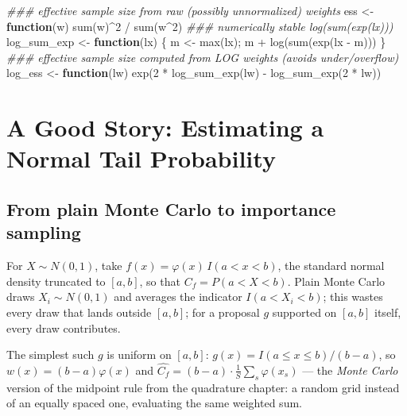 \documentclass[
  letterpaper,
  DIV=11,
  numbers=noendperiod]{scrreprt}
\newenvironment{Shaded}{\begin{snugshade}}{\end{snugshade}}
\newcommand{\ControlFlowTok}[1]{\textcolor[rgb]{0.00,0.23,0.31}{\textbf{#1}}}
\newcommand{\DecValTok}[1]{\textcolor[rgb]{0.68,0.00,0.00}{#1}}
\newcommand{\DocumentationTok}[1]{\textcolor[rgb]{0.37,0.37,0.37}{\textit{#1}}}
\newcommand{\FunctionTok}[1]{\textcolor[rgb]{0.28,0.35,0.67}{#1}}
\newcommand{\NormalTok}[1]{\textcolor[rgb]{0.00,0.23,0.31}{#1}}
\newcommand{\OtherTok}[1]{\textcolor[rgb]{0.00,0.23,0.31}{#1}}
\newcommand{\SpecialCharTok}[1]{\textcolor[rgb]{0.37,0.37,0.37}{#1}}
\begin{document}
\begin{Shaded}
\begin{Highlighting}[]
\DocumentationTok{\#\#\# effective sample size from raw (possibly unnormalized) weights}
\NormalTok{ess }\OtherTok{\textless{}{-}} \ControlFlowTok{function}\NormalTok{(w) }\FunctionTok{sum}\NormalTok{(w)}\SpecialCharTok{\^{}}\DecValTok{2} \SpecialCharTok{/} \FunctionTok{sum}\NormalTok{(w}\SpecialCharTok{\^{}}\DecValTok{2}\NormalTok{)}
\DocumentationTok{\#\#\# numerically stable log(sum(exp(lx)))}
\NormalTok{log\_sum\_exp }\OtherTok{\textless{}{-}} \ControlFlowTok{function}\NormalTok{(lx) \{ m }\OtherTok{\textless{}{-}} \FunctionTok{max}\NormalTok{(lx); m }\SpecialCharTok{+} \FunctionTok{log}\NormalTok{(}\FunctionTok{sum}\NormalTok{(}\FunctionTok{exp}\NormalTok{(lx }\SpecialCharTok{{-}}\NormalTok{ m))) \}}
\DocumentationTok{\#\#\# effective sample size computed from LOG weights (avoids under/overflow)}
\NormalTok{log\_ess }\OtherTok{\textless{}{-}} \ControlFlowTok{function}\NormalTok{(lw) }\FunctionTok{exp}\NormalTok{(}\DecValTok{2} \SpecialCharTok{*} \FunctionTok{log\_sum\_exp}\NormalTok{(lw) }\SpecialCharTok{{-}} \FunctionTok{log\_sum\_exp}\NormalTok{(}\DecValTok{2} \SpecialCharTok{*}\NormalTok{ lw))}
\end{Highlighting}
\end{Shaded}

\section{A Good Story: Estimating a Normal Tail
Probability}\label{a-good-story-estimating-a-normal-tail-probability}

\subsection{From plain Monte Carlo to importance
sampling}\label{from-plain-monte-carlo-to-importance-sampling}

For \(X \sim N(0,1)\), take \(f(x) = \varphi(x)\,I(a<x<b)\), the
standard normal density truncated to \([a,b]\), so that
\(C_f = P(a<X<b)\). Plain Monte Carlo draws \(X_i \sim N(0,1)\) and
averages the indicator \(I(a<X_i<b)\); this wastes every draw that lands
outside \([a,b]\); for a proposal \(g\) supported on \([a,b]\) itself,
every draw contributes.

The simplest such \(g\) is uniform on \([a,b]\):
\(g(x) = I(a\le x\le b)/(b-a)\), so \(w(x) = (b-a)\varphi(x)\) and
\(\widehat{C_f} = (b-a)\cdot\frac1S\sum_s
\varphi(x_s)\) --- the \emph{Monte Carlo} version of the midpoint rule
from the quadrature chapter: a random grid instead of an equally spaced
one, evaluating the same weighted sum.
\end{document}
